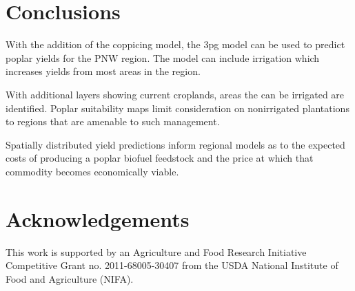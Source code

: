 \documentclass[preprint,12pt]{elsarticle}
\begin{document}
\section{Conclusions}
\label{sec:conclude}

With the addition of the coppicing model, the \ac{3pg} model can be
used to predict poplar yields for the \ac{PNW} region.  The model can
include irrigation which increases yields from most areas in the region.  

With additional layers showing current croplands, areas the can be
irrigated are identified.  Poplar suitability maps limit consideration
on nonirrigated plantations to regions that are amenable to such
management.

Spatially distributed yield predictions inform regional models as to
the expected costs of producing a poplar biofuel feedstock and the
price at which that commodity becomes economically viable.

\section{Acknowledgements}
This work is supported by an Agriculture and Food Research Initiative
Competitive Grant no. 2011-68005-30407 from the USDA National
Institute of Food and Agriculture (NIFA).



 


\end{document}
